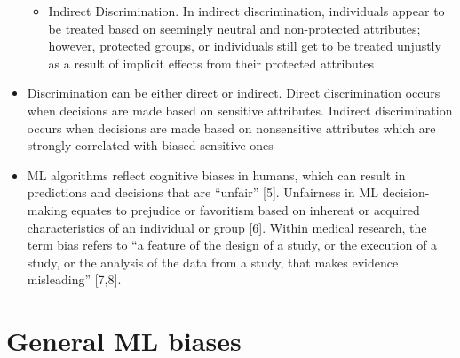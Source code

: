 \documentclass[12pt, a4paper, oneside]{book}   	%
\begin{document}
\begin{itemize}
\begin{itemize}
					\item Indirect Discrimination. In indirect discrimination, individuals appear to be treated based on seemingly neutral and non-protected attributes; however, protected groups, or individuals still get to be treated unjustly as a result of implicit effects from their protected attributes \autocite{Mehrabi_2021}
				\end{itemize}
				\item Discrimination can be either direct or indirect. Direct discrimination occurs when decisions are made based on sensitive attributes. Indirect discrimination occurs when decisions are made based on nonsensitive attributes which are strongly correlated with biased sensitive ones \autocite{M62_}
				\item ML algorithms reflect cognitive biases in humans, which can result in predictions and decisions that are “unfair” [5]. Unfairness in ML decision-making equates to prejudice or favoritism based on inherent or acquired characteristics of an individual or group [6]. Within medical research, the term bias refers to “a feature of the design of a study, or the execution of a study, or the analysis of the data from a study, that makes evidence misleading” [7,8]. \autocite{Montonaya_2025}
			\end{itemize}
		
		
		\section{General ML biases}
		
\end{document}
